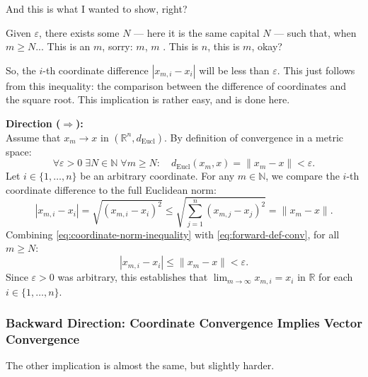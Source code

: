 \begin{proofWrapper}
\begin{speech}[01:09:17 - 01:10:16]
And this is what I wanted to show, right?

Given $\varepsilon$, there exists some $N$ --- here it is the same capital $N$ --- such that, when $m \ge N$... This is an $m$, sorry: $m$, $m$ . This is $n$, this is $m$, okay?

So, the $i$-th coordinate difference $|x_{m,i} - x_i|$ will be less than $\varepsilon$. This just follows from this inequality: the comparison between the difference of coordinates and the square root. This implication is rather easy, and is done here. 
\end{speech}

\begin{content}
\textbf{Direction ($\Longrightarrow$):} \\
Assume that $x_m \to x$ in $(\mathbb{R}^n, d_{\text{Eucl}})$. By definition of convergence in a metric space:
\begin{equation}\label{eq:forward-def-conv}
\forall \varepsilon > 0 \;\exists N \in \mathbb{N} \;\forall m \ge N \colon \quad d_{\text{Eucl}}(x_m, x) = \|x_m - x\| < \varepsilon.
\end{equation}
Let $i \in \{1, \dots, n\}$ be an arbitrary coordinate. For any $m \in \mathbb{N}$, we compare the $i$-th coordinate difference to the full Euclidean norm:
\begin{equation}\label{eq:coordinate-norm-inequality}
|x_{m,i} - x_i| = \sqrt{(x_{m,i} - x_i)^2} \le \sqrt{\sum_{j=1}^n (x_{m,j} - x_j)^2} = \|x_m - x\|.
\end{equation}
Combining \eqref{eq:coordinate-norm-inequality} with \eqref{eq:forward-def-conv}, for all $m \ge N$:
\[
|x_{m,i} - x_i| \le \|x_m - x\| < \varepsilon.
\]
Since $\varepsilon > 0$ was arbitrary, this establishes that $\lim_{m \to \infty} x_{m,i} = x_i$ in $\mathbb{R}$ for each $i \in \{1, \dots, n\}$.
\end{content}

\subsubsection{Backward Direction: Coordinate Convergence Implies Vector Convergence}

\begin{speech}[01:10:16 - 01:12:27]
The other implication is almost the same, but slightly harder. 


\end{speech}
\end{proofWrapper}
